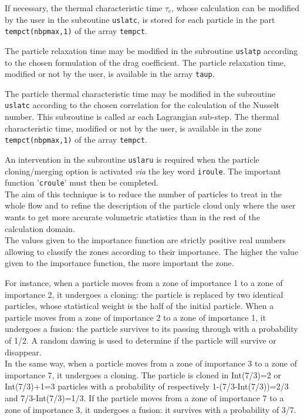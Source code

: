 {{{\noindent
If necessary, the thermal characteristic time $\tau_c$, whose calculation can be modified by the user in the subroutine
\texttt{uslatc}, is stored for each particle in the part \texttt{tempct(nbpmax,1)} of the array \texttt{tempct}.


\noindent
The particle relaxation time may be modified in the subroutine \texttt{uslatp} according to the chosen formulation of the drag coefficient. The particle relaxation time, modified or not by the user, is available in the array \texttt{taup}.



\noindent
The particle thermal characteristic time may be modified in the subroutine \texttt{uslatc} according to the chosen correlation for the calculation of the Nusselt number. This subroutine is called ar each Lagrangian sub-step. The thermal characteristic time, modified or not by the user, is available in the zone \texttt{tempct(nbpmax,1)} of the array \texttt{tempct}.




\noindent
An intervention in the subroutine \texttt{uslaru} is required when the particle
cloning/merging option is activated {\em via} the key word \texttt{iroule}. The
important function '\texttt{croule}' must then be completed. \\
The aim of this technique is to reduce the number of particles to treat in
the whole flow and to refine the description of the particle cloud only
where the user wants to get more accurate volumetric statistics than in the
rest of the calculation domain. \\
The values given to the importance function are strictly positive real
numbers allowing to classify the zones according to their
importance. The higher the value given to the importance function, the
more important the zone.

\noindent
For instance, when a particle moves from a zone of importance 1 to a
zone of importance 2, it undergoes a cloning: the particle is replaced by two
identical particles, whose statistical weight is the half of the initial
particle. When a particle moves from a zone of importance 2 to a zone of
importance 1, it undergoes a fusion: the particle survives to its passing
through with a probability of 1/2. A random dawing is used to
determine if the particle will survive or disappear.\\
In the same way, when a particle moves from a zone of importance 3 to a
zone of importance 7, it undergoes a cloning. The particle is cloned in
Int(7/3)=2 or Int(7/3)+1=3 particles with a probability of respectively
1-(7/3-Int(7/3))=2/3 and 7/3-Int(7/3)=1/3. If the particle moves from a
zone of importance 7 to a zone of importance 3, it undergoes a fusion:
it survives with a probability of 3/7.

}}}
